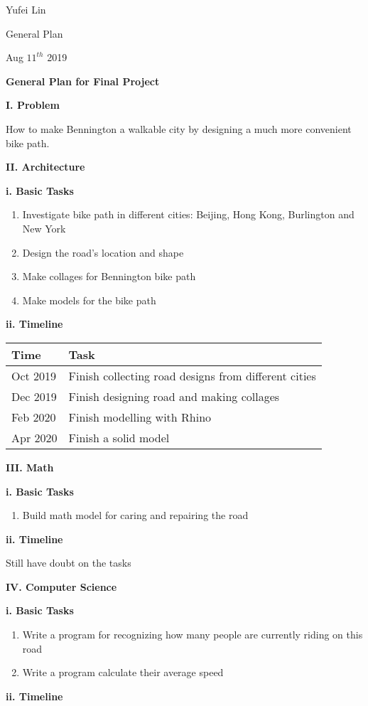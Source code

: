 \documentclass[a4paper,12pt]{report}
\begin{document}
\noindent
Yufei Lin

\noindent
General Plan

\noindent
Aug \(11^{th}\) 2019

\begin{center}
\textbf{General Plan for Final Project}
\end{center}

\noindent
\textbf{I. Problem}

\noindent
How to make Bennington a walkable city by designing a much more convenient bike path.

\noindent
\textbf{II. Architecture}

\noindent
\textbf{i. Basic Tasks}

\begin{enumerate}
\item Investigate bike path in different cities: Beijing, Hong Kong, Burlington and New York
\item Design the road's location and shape
\item Make collages for Bennington bike path
\item Make models for the bike path
\end{enumerate}

\noindent
\textbf{ii. Timeline}

\begin{table}[h]
\centering
\begin{tabular}{l | l}
\textbf{Time} & \textbf{Task} \\
\hline
Oct 2019   & Finish collecting road designs from different cities  \\
Dec 2019   & Finish designing road and making collages  \\
Feb 2020    & Finish modelling with Rhino \\
Apr 2020 & Finish a solid model
\end{tabular}
\end{table}

\noindent
\textbf{III. Math}

\noindent
\textbf{i. Basic Tasks}

\begin{enumerate}
\item Build math model for caring and repairing the road
\end{enumerate}

\noindent
\textbf{ii. Timeline}

\noindent
Still have doubt on the tasks

\noindent
\textbf{IV. Computer Science}

\noindent
\textbf{i. Basic Tasks}

\begin{enumerate}
\item Write a program for recognizing how many people are currently riding on this road
\item Write a program calculate their average speed
\end{enumerate}

\noindent
\textbf{ii. Timeline}
\end{document}
